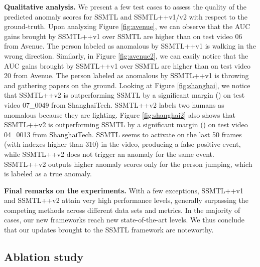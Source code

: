 \documentclass[times,twocolumn,final,authoryear]{elsarticle}
\begin{document}
\noindent
{\bf Qualitative analysis.}
We present a few test cases to assess the quality of the predicted anomaly scores for SSMTL and SSMTL++v1/v2 with respect to the ground-truth. 
Upon analyzing Figure \ref{fig:avenue}, we can observe that the AUC gains brought by SSMTL++v1 over SSMTL are higher than  on test video 06 from Avenue. The person labeled as anomalous by SSMTL++v1 is walking in the wrong direction. Similarly, in Figure \ref{fig:avenue2}, we can easily notice that the AUC gains brought by SSMTL++v1 over SSMTL are higher than  on test video 20 from Avenue. The person labeled as anomalous by SSMTL++v1 is throwing and gathering papers on the ground.
Looking at Figure \ref{fig:shanghai}, we notice that SSMTL++v2 is outperforming SSMTL by a significant margin () on test video 07\_0049 from ShanghaiTech. SSMTL++v2 labels two humans as anomalous because they are fighting. Figure \ref{fig:shanghai2} also shows that SSMTL++v2 is outperforming SSMTL by a significant margin () on test video 04\_0013 from ShanghaiTech. SSMTL seems to activate on the last 50 frames (with indexes higher than 310) in the video, producing a false positive event, while SSMTL++v2 does not trigger an anomaly for the same event. SSMTL++v2 outputs higher anomaly scores only for the person jumping, which is labeled as a true anomaly.

\noindent
{\bf Final remarks on the experiments.}
With a few exceptions, SSMTL++v1 and SSMTL++v2 attain very high performance levels, generally surpassing the competing methods across different data sets and metrics. In the majority of cases, our new frameworks reach new state-of-the-art levels. We thus conclude that our updates brought to the SSMTL framework are noteworthy.

\subsection{Ablation study}
\end{document}
